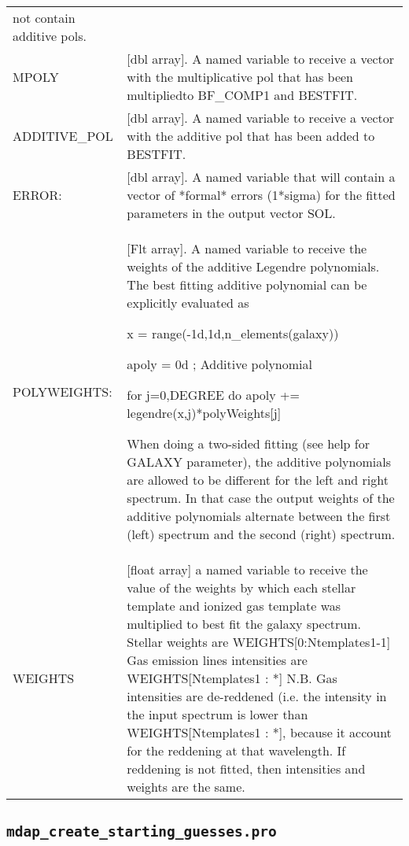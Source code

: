 \documentclass[11pt]{book}
\begin{document}
\begin{center}
\begin{longtable}{p{2.7cm}| p{11.1cm}}
       not contain additive pols.\\
%
 MPOLY &[dbl array]. A  named variable to receive a vector with the multiplicative
       pol that has been multipliedto BF\_COMP1 and BESTFIT.\\
%
 ADDITIVE\_POL &[dbl array]. A  named variable to receive a vector with the additive
      pol that has been added to BESTFIT. \\
%
ERROR: &[dbl array]. A  named variable that will contain a vector of *formal* errors
       (1*sigma) for the fitted parameters in the output vector SOL.\\
%
POLYWEIGHTS: &[Flt array]. A named variable to receive the weights of the additive Legendre polynomials.
       The best fitting additive polynomial can be explicitly evaluated as

           x = range(-1d,1d,n\_elements(galaxy))

           apoly = 0d ; Additive polynomial

           for j=0,DEGREE do apoly += legendre(x,j)*polyWeights[j]

     When doing a two-sided fitting (see help for GALAXY parameter), the additive
       polynomials are allowed to be different for the left and right spectrum.
       In that case the output weights of the additive polynomials alternate between
       the first (left) spectrum and the second (right) spectrum.\\
%
   WEIGHTS  &[float array] a named variable to receive the value of the weights by which each stellar
       template and ionized gas template was multiplied to best fit
       the galaxy spectrum.
        Stellar weights are WEIGHTS[0:Ntemplates1-1]
        Gas emission lines intensities are  WEIGHTS[Ntemplates1 : *]
        N.B. Gas intensities are de-reddened (i.e. the intensity in
        the input spectrum is lower than WEIGHTS[Ntemplates1 : *],
        because it account for the reddening at that wavelength.
        If reddening is not fitted, then intensities and weights
        are the same.\\
%
\hline
\end{longtable}
\end{center}


\subsection{{\tt mdap\_create\_starting\_guesses.pro}}
\label{dap_sec:mdap_create_starting_guesses}
\end{document}
